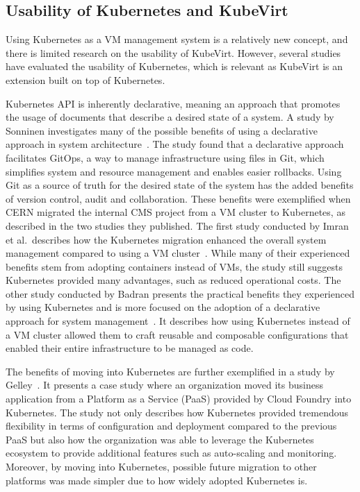 \documentclass{article}
\begin{document}
\subsection{Usability of Kubernetes and KubeVirt}
Using Kubernetes as a VM management system is a relatively new concept, and there is limited research on the usability of KubeVirt. However, several studies have evaluated the usability of Kubernetes, which is relevant as KubeVirt is an extension built on top of Kubernetes.

Kubernetes API is inherently declarative, meaning an approach that promotes the usage of documents that describe a desired state of a system. A study by Sonninen investigates many of the possible benefits of using a declarative approach in system architecture\ \cite{declarative-benefits}. The study found that a declarative approach facilitates GitOps, a way to manage infrastructure using files in Git, which simplifies system and resource management and enables easier rollbacks. Using Git as a source of truth for the desired state of the system has the added benefits of version control, audit and collaboration. These benefits were exemplified when CERN migrated the internal CMS project from a VM cluster to Kubernetes, as described in the two studies they published. The first study conducted by Imran et al.\ describes how the Kubernetes migration enhanced the overall system management compared to using a VM cluster\ \cite{k8s-cern}. While many of their experienced benefits stem from adopting containers instead of VMs, the study still suggests Kubernetes provided many advantages, such as reduced operational costs. The other study conducted by Badran presents the practical benefits they experienced by using Kubernetes and is more focused on the adoption of a declarative approach for system management\ \cite{k8s-cern-techreport}. It describes how using Kubernetes instead of a VM cluster allowed them to craft reusable and composable configurations that enabled their entire infrastructure to be managed as code. 

The benefits of moving into Kubernetes are further exemplified in a study by Gelley\ \cite{k8s-cloud-foundry}. It presents a case study where an organization moved its business application from a Platform as a Service (PaaS) provided by Cloud Foundry into Kubernetes. The study not only describes how Kubernetes provided tremendous flexibility in terms of configuration and deployment compared to the previous PaaS but also how the organization was able to leverage the Kubernetes ecosystem to provide additional features such as auto-scaling and monitoring. Moreover, by moving into Kubernetes, possible future migration to other platforms was made simpler due to how widely adopted Kubernetes is. 
\end{document}
